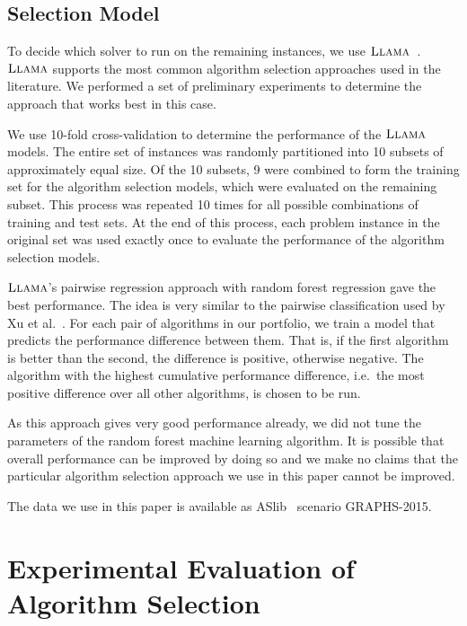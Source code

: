 \documentclass{llncs}
\newcommand{\LLAMA}{$\textsc{Llama}$\xspace}
\begin{document}
\subsection{Selection Model}

To decide which solver to run on the remaining instances, we use \LLAMA~\cite{kotthoff_llama_2013}.
\LLAMA supports the most common algorithm selection approaches used in the literature. We performed a
set of preliminary experiments to determine the approach that works best in this case.

We use 10-fold cross-validation to determine the performance of the \LLAMA models. The entire set of
instances was randomly partitioned into 10 subsets of approximately equal size. Of the 10 subsets, 9
were combined to form the training set for the algorithm selection models, which were evaluated on
the remaining subset. This process was repeated 10 times for all possible combinations of training
and test sets. At the end of this process, each problem instance in the original set was used
exactly once to evaluate the performance of the algorithm selection models.

\LLAMA's pairwise regression approach with random forest regression gave the best performance. The
idea is very similar to the pairwise classification used by Xu et al.\ \cite{xu_satzilla_2008}. For
each pair of algorithms in our portfolio, we train a model that predicts the performance difference
between them. That is, if the first algorithm is better than the second, the difference is positive,
otherwise negative. The algorithm with the highest cumulative performance difference, i.e.\ the most
positive difference over all other algorithms, is chosen to be run.

As this approach gives very good performance already, we did not tune the parameters of the random
forest machine learning algorithm. It is possible that overall performance can be improved by doing
so and we make no claims that the particular algorithm selection approach we use in this paper
cannot be improved.

The data we use in this paper is available as ASlib~\cite{aslib} scenario GRAPHS-2015.

\section{Experimental Evaluation of Algorithm Selection}\label{sec:algsel-exps}
\end{document}
